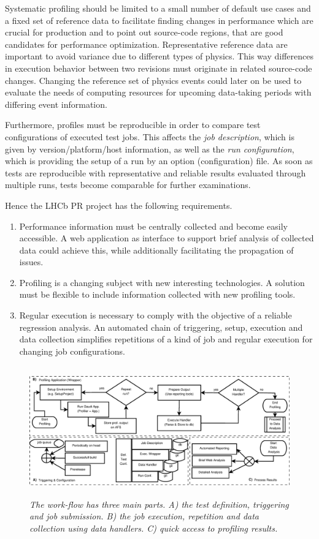 \documentclass[a4paper]{jpconf}
\begin{document}
Systematic profiling should be limited to a small number of default use cases and a fixed set of reference data to facilitate finding changes in performance which are crucial for production and to point out source-code regions, that are good candidates for performance optimization. Representative reference data are important to avoid variance due to different types of physics. This way differences in execution behavior between two revisions must originate in related source-code changes. Changing the reference set of physics events could later on be used to evaluate the needs of computing resources for upcoming data-taking periods with differing event information.

Furthermore, profiles must be reproducible in order to compare test configurations of executed test jobs. This affects the \textit{job description}, which is given by version/platform/host information, as well as the \textit{run configuration}, which is providing the setup of a run by an option (configuration) file. As soon as tests are reproducible with representative and reliable results evaluated through multiple runs, tests become comparable for further examinations.

Hence the LHCb PR project has the following requirements.
\begin{enumerate}
 \item Performance information must be centrally collected and become easily accessible. A web application as interface to support brief analysis of collected data could achieve this, while additionally facilitating the propagation of issues.
 \item Profiling is a changing subject with new interesting technologies. A solution must be flexible to include information collected with new profiling tools.
 \item Regular execution is necessary to comply with the objective of a reliable regression analysis. An automated chain of triggering, setup, execution and data collection simplifies repetitions of a kind of job and regular execution for changing job configurations.
\end{enumerate}

\begin{figure}
\includegraphics[width=\textwidth, height=5.6cm]{figures/profiling_process.eps}
\caption{\small \textit{The work-flow has three main parts. A) the test definition, triggering and job submission. B) the job execution, repetition and data collection using data handlers. C) quick access to profiling results.}}
\label{fig:profiling_process}
\end{figure}
\end{document}
